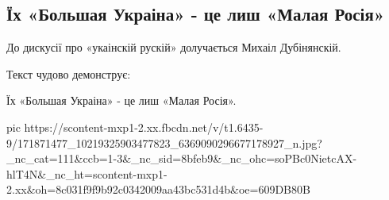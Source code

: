  
 
 
 
 
\subsection{Їх «Большая Украіна» - це  лиш «Малая Росія»}

До дискусії про «укаінскій рускій» долучається Михаіл Дубінянскій. 

Текст чудово демонструє:

Їх «Большая Украіна» - це лиш «Малая Росія».

\ifcmt
  pic https://scontent-mxp1-2.xx.fbcdn.net/v/t1.6435-9/171871477_10219325903477823_6369090296677178927_n.jpg?_nc_cat=111&ccb=1-3&_nc_sid=8bfeb9&_nc_ohc=soPBc0NietcAX-hlT4N&_nc_ht=scontent-mxp1-2.xx&oh=8c031f9f9b92c0342009aa43bc531d4b&oe=609DB80B
\fi

